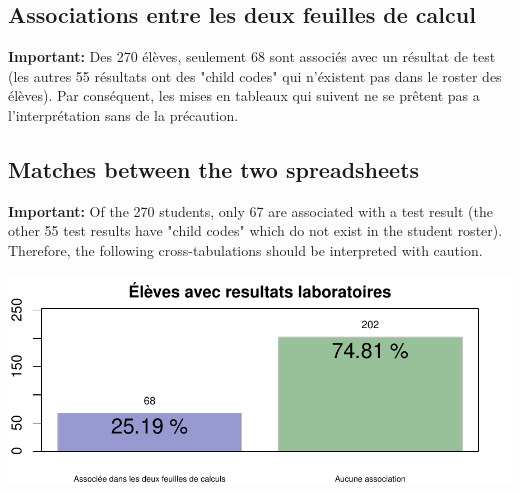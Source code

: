 \documentclass[11pt]{article}
\begin{document}
\begin{multicols}{2} 



\subsection*{Associations entre les deux feuilles de calcul}
\textbf{Important:} Des 270 élèves, seulement 68 sont associés avec un résultat de test (les autres 55 résultats ont des "child codes" qui n'éxistent pas dans le roster des élèves).  Par conséquent, les  mises en tableaux qui suivent ne se prêtent pas a l'interprétation sans de la précaution.
\vfill
\columnbreak

\subsection*{Matches between the two spreadsheets}
\textbf{Important:} Of the 270 students, only 67 are associated with a test result (the other 55 test results have "child codes" which do not exist in the student roster).  Therefore, the following cross-tabulations should be interpreted with caution.

\end{multicols}
\begin{center}
\includegraphics{chik_analyse_pour_madsen-007}
\end{center}
\end{document}
